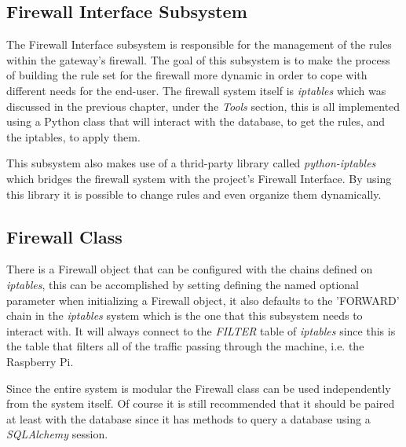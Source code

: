 \begin{enumerate}


\section{Firewall Interface Subsystem}
\label{chap4:sec:firewall-sys}
The Firewall Interface subsystem is responsible for the management of the rules
within the gateway's firewall. The goal of this subsystem is to make the process
of building the rule set for the firewall more dynamic in order to cope with
different needs for the end-user. The firewall system itself is \emph{iptables}
which was discussed in the previous chapter, under the \emph{Tools} section,
this is all implemented using a Python class that will interact with the
database, to get the rules, and the iptables, to apply them.

This subsystem also makes use of a thrid-party library called
\emph{python-iptables} which bridges the firewall system with the project's
Firewall Interface. By using this library it is possible to change rules and
even organize them dynamically.

\subsection{Firewall Class}
\label{chap4:sec:firewall-sys:firewall-class}
There is a Firewall object that can be configured with the chains defined on
\emph{iptables}, this can be accomplished by setting defining the named optional
parameter when initializing a Firewall object, it also defaults to the 'FORWARD'
chain in the \emph{iptables} system which is the one that this subsystem needs
to interact with. It will always connect to the \emph{FILTER} table of
\emph{iptables} since this is the table that filters all of the traffic passing
through the machine, i.e. the Raspberry Pi.

Since the entire system is modular the Firewall class can be used independently
from the system itself. Of course it is still recommended that it should be
paired at least with the database since it has methods to query a database using
a \emph{SQLAlchemy} session.


\end{enumerate}
